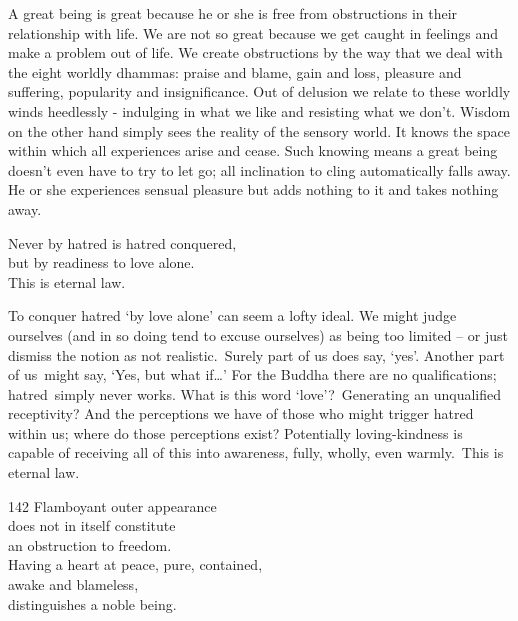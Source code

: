 \begin{dhpRefl}

A great being is great because he or she is free from obstructions in
their relationship with life. We are not so great because we get
caught in feelings and make a problem out of life. We create
obstructions by the way that we deal with the eight worldly dhammas:
praise and blame, gain and loss, pleasure and suffering, popularity
and insignificance. Out of delusion we relate to these worldly winds
heedlessly - indulging in what we like and resisting what we don't.
Wisdom on the other hand simply sees the reality of the sensory
world. It knows the space within which all experiences arise and
cease. Such knowing means a great being doesn't even have to try to
let go; all inclination to cling automatically falls away. He or she
experiences sensual pleasure but adds nothing to it and takes nothing
away.

\end{dhpRefl}


\begin{dhpVerse}{5}
\label{dhp-5}
Never by hatred is hatred conquered,\\
but by readiness to love alone.\\
This is eternal law.
\end{dhpVerse}

\begin{dhpRefl}

To conquer hatred `by love alone' can seem a lofty ideal. We might
judge ourselves (and in so doing tend to excuse ourselves) as being
too limited -- or just dismiss the notion as not realistic. Surely
part of us does say, `yes'. Another part of us might say, `Yes, but
what if\ldots{}' For the Buddha there are no qualifications;
hatred simply never works. What is this word `love'? Generating an
unqualified receptivity? And the perceptions we have of those who
might trigger hatred within us; where do those perceptions exist?
Potentially loving-kindness is capable of receiving all of this into
awareness, fully, wholly, even warmly. This is eternal law.

\end{dhpRefl}


\begin{dhpVerse}{142}
\label{dhp-142}
Flamboyant outer appearance\\
does not in itself constitute\\
an obstruction to freedom.\\
Having a heart at peace, pure, contained,\\
awake and blameless,\\
distinguishes a noble being.
\end{dhpVerse}

